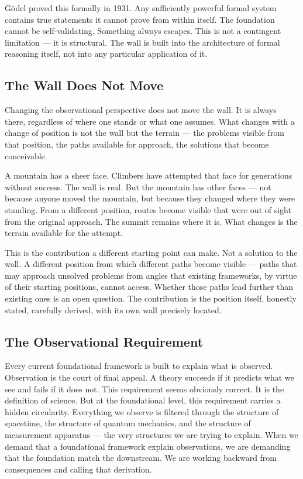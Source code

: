 \documentclass[11pt,letterpaper]{article}
\begin{document}
Gödel proved this formally in 1931. Any sufficiently powerful formal system contains true statements it cannot prove from within itself. The foundation cannot be self-validating. Something always escapes. This is not a contingent limitation — it is structural. The wall is built into the architecture of formal reasoning itself, not into any particular application of it.
\subsection{The Wall Does Not Move}
\label{sec:orgc7fd810}
Changing the observational perspective does not move the wall. It is always there, regardless of where one stands or what one assumes. What changes with a change of position is not the wall but the terrain — the problems visible from that position, the paths available for approach, the solutions that become conceivable.

A mountain has a sheer face. Climbers have attempted that face for generations without success. The wall is real. But the mountain has other faces — not because anyone moved the mountain, but because they changed where they were standing. From a different position, routes become visible that were out of sight from the original approach. The summit remains where it is. What changes is the terrain available for the attempt.

This is the contribution a different starting point can make. Not a solution to the wall. A different position from which different paths become visible — paths that may approach unsolved problems from angles that existing frameworks, by virtue of their starting positions, cannot access. Whether those paths lead further than existing ones is an open question. The contribution is the position itself, honestly stated, carefully derived, with its own wall precisely located.
\subsection{The Observational Requirement}
\label{sec:org8deafa1}
Every current foundational framework is built to explain what is observed. Observation is the court of final appeal. A theory succeeds if it predicts what we see and fails if it does not. This requirement seems obviously correct. It is the definition of science.
But at the foundational level, this requirement carries a hidden circularity. Everything we observe is filtered through the structure of spacetime, the structure of quantum mechanics, and the structure of measurement apparatus — the very structures we are trying to explain. When we demand that a foundational framework explain observations, we are demanding that the foundation match the downstream. We are working backward from consequences and calling that derivation.
\end{document}
